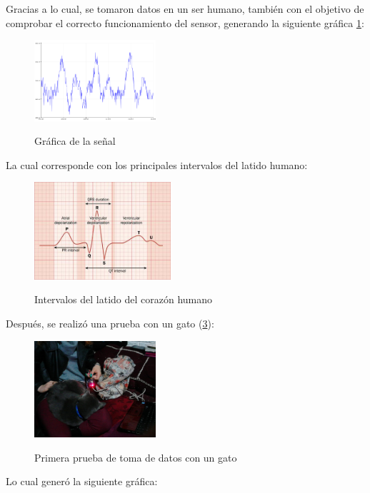 \documentclass[letterpaper, 10 pt, conference]{ieeeconf}  %
\begin{document}
Gracias a lo cual, se tomaron datos en un ser humano, tambi\'en con el objetivo de comprobar el correcto funcionamiento del sensor, generando la siguiente gr\'afica \ref{fig:senal}:
 
\begin{figure}
\centering
\includegraphics[width=0.4\textwidth]{senal.png}
\label{fig:senal}
\caption{Gr\'afica de la se\~nal}
\end{figure}

La cual corresponde con los principales intervalos del latido humano:

\begin{figure}
\centering
\includegraphics[width=0.45\textwidth]{ecg.jpg}
\label{fig:intervalo}
\caption{Intervalos del latido del coraz\'on humano}
\end{figure}

Despu\'es, se realiz\'o una prueba con un gato (\ref{fig:cat1}):

\begin{figure}
\centering
\includegraphics[width=0.4\textwidth]{cat1.png}
\label{fig:cat1}
\caption{Primera prueba de toma de datos con un gato}
\end{figure}

Lo cual gener\'o la siguiente gr\'afica:
\end{document}
